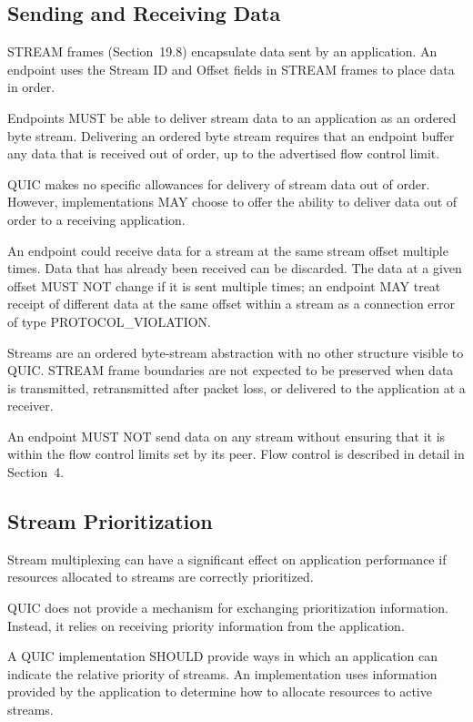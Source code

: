 \documentclass{article}
\begin{document}
\subsection{Sending and Receiving Data}

STREAM frames (Section~19.8) encapsulate data sent by an application. An endpoint uses the Stream ID and Offset fields in STREAM frames to place data in order.

Endpoints MUST be able to deliver stream data to an application as an ordered byte stream.  Delivering an ordered byte stream requires that an endpoint buffer any data that is received out of order, up to the advertised flow control limit.

QUIC makes no specific allowances for delivery of stream data out of order.  However, implementations MAY choose to offer the ability to deliver data out of order to a receiving application.

An endpoint could receive data for a stream at the same stream offset multiple times.  Data that has already been received can be discarded.  The data at a given offset MUST NOT change if it is sent multiple times; an endpoint MAY treat receipt of different data at the same offset within a stream as a connection error of type PROTOCOL\_VIOLATION.

Streams are an ordered byte-stream abstraction with no other structure visible to QUIC.  STREAM frame boundaries are not expected to be preserved when data is transmitted, retransmitted after packet loss, or delivered to the application at a receiver.

An endpoint MUST NOT send data on any stream without ensuring that it is within the flow control limits set by its peer.  Flow control is described in detail in Section~4.

\subsection{Stream Prioritization}

Stream multiplexing can have a significant effect on application performance if resources allocated to streams are correctly prioritized.

QUIC does not provide a mechanism for exchanging prioritization information.  Instead, it relies on receiving priority information from the application.

A QUIC implementation SHOULD provide ways in which an application can indicate the relative priority of streams.  An implementation uses information provided by the application to determine how to allocate resources to active streams.
\end{document}
